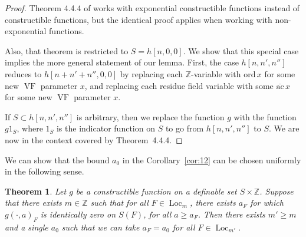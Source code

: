 \documentclass[12pt]{amsart}
\newcommand{\op}[1]{\operatorname{#1}}
\newcommand{\ring}[1]{{\mathbb #1}}
\def\VF{{\op{VF}}}
\newcommand\ord{\mathrm{ord}}
\newcommand\ac{\overline{\mathrm{ac}}}
\theoremstyle{plain}
\newtheorem{thm}{Theorem}
\theoremstyle{definition}
\begin{document}
\begin{proof}  Theorem 4.4.4 of \cite{CGH} works with exponential
  constructible functions instead of constructible functions, but the
  identical proof applies when working with non-exponential functions.

  Also, that theorem is restricted to $S=h[n,0,0]$.  We show that this
  special case implies the more general statement of our lemma.
  First, the case $h[n,n',n'']$ reduces to $h[n+n'+n'',0,0]$ by
  replacing each $\ring{Z}$-variable with $\ord\, x$ for some new
  $\VF$ parameter $x$, and replacing each residue field variable with
  some $\ac\, x$ for some new $\VF$ parameter $x$.

  If $S\subset h[n,n',n'']$ is arbitrary, then we replace the function
  $g$ with the function $g 1_S$, where $1_S$ is the indicator function
  on $S$ to go from $h[n,n',n'']$ to $S$.  We are now in the context
  covered by Theorem~4.4.4.
\end{proof}


We can show that the bound $a_0$ in the Corollary~\ref{cor:12}
can be chosen uniformly in the following sense.  

\begin{thm}\label{thm:uniform}
  Let $g$ be a constructible function on a definable set
  $S\times\ring{Z}$.  Suppose that there exists $m\in\ring{Z}$ such
  that for all $F\in \op{Loc}_m$, there exists $a_F$ for which
  $g(\cdot,a)_F$ is identically zero on $S(F)$, for all $a\ge a_F$.
  Then there exists $m'\ge m$ and a single $a_0$ such that we can take
  $a_F=a_0$ for all $F\in \op{Loc}_{m'}$.
\end{thm}
\end{document}
